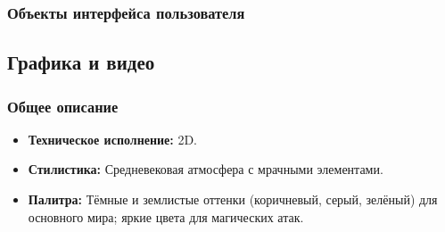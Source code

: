 \documentclass{article}
\begin{document}
\subsubsection{Объекты интерфейса пользователя}

\subsection{Графика и видео}

\subsubsection{Общее описание}
\begin{itemize}
    \item \textbf{Техническое исполнение:} 2D.
    \item \textbf{Стилистика:} Средневековая атмосфера с мрачными элементами.
    \item \textbf{Палитра:} Тёмные и землистые оттенки (коричневый, серый, зелёный) для основного мира; яркие цвета для магических атак.
\end{itemize}
\end{document}
